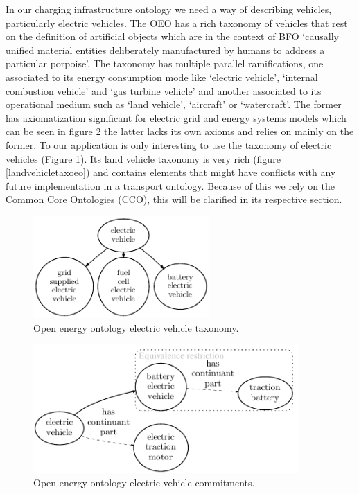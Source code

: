 In our charging infrastructure ontology we need a way of describing vehicles,
particularly electric vehicles. The OEO has a rich taxonomy of vehicles that
rest on the definition of artificial objects which are in the context of BFO
`causally unified material entities deliberately manufactured by humans to
address a particular porpoise'. The taxonomy has multiple parallel
ramifications, one associated to its energy consumption mode like `electric
vehicle', `internal combustion vehicle' and `gas turbine vehicle' and another
associated to its operational medium such as `land vehicle', `aircraft' or
`watercraft'. The former has axiomatization significant for electric grid and
energy systems models which can be seen in figure \ref{evcommitments} the
latter lacks its own axioms and relies on mainly on the former. To our
application is only interesting to use the taxonomy of electric vehicles
(Figure \ref{evtax}). Its land vehicle taxonomy is very rich (figure
\ref{landvehicletaxoeo}) and contains elements that might have conflicts with
any future implementation in a transport ontology. Because of this we rely on
the Common Core Ontologies (CCO), this will be clarified in its respective
section.


\begin{figure}[h]\label{evtax}
    \caption{Open energy ontology electric vehicle taxonomy.}
    \centering
    \includegraphics[width=0.6\textwidth]{images/OEOVehicles}
\end{figure}

\begin{figure}[h]\label{evcommitments}
    \caption{Open energy ontology electric vehicle commitments.}
    \centering
    \includegraphics[width=0.9\textwidth]{images/OEOEV}
\end{figure}



